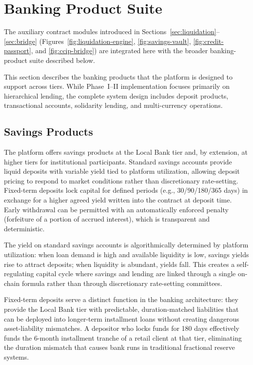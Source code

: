 \documentclass[12pt,a4paper]{report}
\begin{document}
\section{Banking Product Suite}
\label{sec:banking-products}

\noindent The auxiliary contract modules introduced in Sections~\ref{sec:liquidation}--\ref{sec:bridge} (Figures~\ref{fig:liquidation-engine}, \ref{fig:savings-vault}, \ref{fig:credit-passport}, and \ref{fig:ccip-bridge}) are integrated here with the broader banking-product suite described below.

This section describes the banking products that the platform is designed to support across tiers. While Phase~I--II implementation focuses primarily on hierarchical lending, the complete system design includes deposit products, transactional accounts, solidarity lending, and multi-currency operations.

\subsection{Savings Products}

The platform offers savings products at the Local Bank tier and, by extension, at higher tiers for institutional participants. Standard savings accounts provide liquid deposits with variable yield tied to platform utilization, allowing deposit pricing to respond to market conditions rather than discretionary rate-setting. Fixed-term deposits lock capital for defined periods (e.g., 30/90/180/365 days) in exchange for a higher agreed yield written into the contract at deposit time. Early withdrawal can be permitted with an automatically enforced penalty (forfeiture of a portion of accrued interest), which is transparent and deterministic.

The yield on standard savings accounts is algorithmically determined by platform utilization: when loan demand is high and available liquidity is low, savings yields rise to attract deposits; when liquidity is abundant, yields fall. This creates a self-regulating capital cycle where savings and lending are linked through a single on-chain formula rather than through discretionary rate-setting committees.

Fixed-term deposits serve a distinct function in the banking architecture: they provide the Local Bank tier with predictable, duration-matched liabilities that can be deployed into longer-term installment loans without creating dangerous asset-liability mismatches. A depositor who locks funds for 180 days effectively funds the 6-month installment tranche of a retail client at that tier, eliminating the duration mismatch that causes bank runs in traditional fractional reserve systems.
\end{document}
